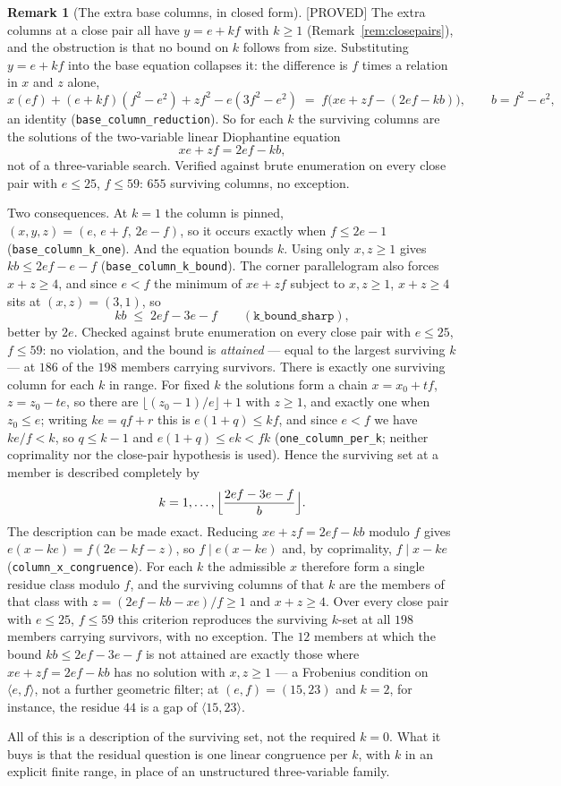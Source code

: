 \documentclass[11pt,reqno]{amsart}
\theoremstyle{plain}
\theoremstyle{definition}
\newtheorem{remark}[theorem]{Remark}
\newcommand{\lab}[1]{\hfill\textnormal{\footnotesize\textsc{[#1]}}}
\begin{document}
\begin{remark}[The extra base columns, in closed form]\label{rem:columnreduction}\lab{PROVED}
The extra columns at a close pair all have $y=e+kf$ with $k\ge1$
(Remark~\ref{rem:closepairs}), and the obstruction is that no bound on $k$ follows from size.
Substituting $y=e+kf$ into the base equation collapses it: the difference is $f$ times a relation in
$x$ and $z$ alone,
\[
x(ef)+(e+kf)(f^2-e^2)+zf^2-e(3f^2-e^2)\;=\;f\bigl(xe+zf-(2ef-kb)\bigr),\qquad b=f^2-e^2,
\]
an identity (\texttt{base\_column\_reduction}). So for each $k$ the surviving columns are the
solutions of the two-variable linear Diophantine equation
\[
xe+zf=2ef-kb ,
\]
not of a three-variable search. Verified against brute enumeration on every close pair with
$e\le25$, $f\le59$: $655$ surviving columns, no exception.

Two consequences. At $k=1$ the column is pinned, $(x,y,z)=(e,\,e+f,\,2e-f)$, so it occurs exactly
when $f\le 2e-1$ (\texttt{base\_column\_k\_one}). And the equation bounds $k$. Using only $x,z\ge1$ gives $kb\le 2ef-e-f$
(\texttt{base\_column\_k\_bound}). The corner parallelogram also forces $x+z\ge4$, and since $e<f$
the minimum of $xe+zf$ subject to $x,z\ge1$, $x+z\ge4$ sits at $(x,z)=(3,1)$, so
\[
kb\;\le\;2ef-3e-f
\qquad(\texttt{k\_bound\_sharp}),
\]
better by $2e$. Checked against brute enumeration on every close pair with $e\le25$, $f\le59$: no
violation, and the bound is \emph{attained} --- equal to the largest surviving $k$ --- at $186$ of
the $198$ members carrying survivors. There is exactly one surviving column for each $k$ in range. For fixed $k$ the solutions form a
chain $x=x_0+tf$, $z=z_0-te$, so there are $\lfloor(z_0-1)/e\rfloor+1$ with $z\ge1$, and exactly one
when $z_0\le e$; writing $ke=qf+r$ this is $e(1+q)\le kf$, and since $e<f$ we have $ke/f<k$, so
$q\le k-1$ and $e(1+q)\le ek<fk$ (\texttt{one\_column\_per\_k}; neither coprimality nor the
close-pair hypothesis is used). Hence the surviving set at a member is described completely by
\[
k=1,\dots,\Bigl\lfloor\frac{2ef-3e-f}{b}\Bigr\rfloor .
\]
The description can be made exact. Reducing $xe+zf=2ef-kb$ modulo $f$ gives
$e(x-ke)=f(2e-kf-z)$, so $f\mid e(x-ke)$ and, by coprimality, $f\mid x-ke$
(\texttt{column\_x\_congruence}). For each $k$ the admissible $x$ therefore form a single residue
class modulo $f$, and the surviving columns of that $k$ are the members of that class with
$z=(2ef-kb-xe)/f\ge1$ and $x+z\ge4$. Over every close pair with $e\le25$, $f\le59$ this criterion
reproduces the surviving $k$-set at all $198$ members carrying survivors, with no exception. The $12$
members at which the bound $kb\le2ef-3e-f$ is not attained are exactly those where
$xe+zf=2ef-kb$ has no solution with $x,z\ge1$ --- a Frobenius condition on $\langle e,f\rangle$, not
a further geometric filter; at $(e,f)=(15,23)$ and $k=2$, for instance, the residue $44$ is a gap of
$\langle15,23\rangle$.

All of this is a description of the surviving set, not the required $k=0$. What it buys is that the
residual question is one linear congruence per $k$, with $k$ in an explicit finite range, in place of
an unstructured three-variable family.
\end{remark}
\end{document}

